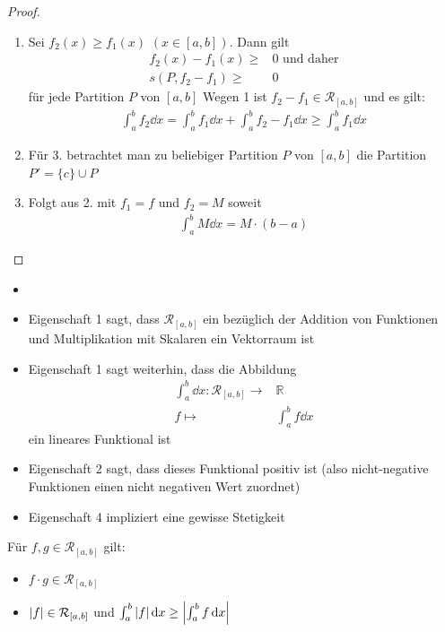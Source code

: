 \begin{proof}
\begin{enumerate}
		\item Sei $f_2(x) \geq f_1(x)$ $(x \in [a,b])$. Dann gilt
		\begin{align*}		
			f_2(x) - f_1(x) \geq & 0 \text{ und daher} \\
			s(P, f_2 -f_1) \geq & 0
		\end{align*} 
		 für jede Partition $P$ von $[a,b]$ 
		Wegen 1 ist $f_2 -f_1 \in \mathcal{R}_{[a,b]}$ und es gilt:
		\begin{align*}
			\int_a^b f_2 \dd{x} = \int_a^b f_1 \dd{x} + \int_a^bf_2-f_1 \dd{x} 
			\geq \int_a^b f_1 \dd{x}
	\end{align*}		 
	\item Für 3. betrachtet man zu beliebiger Partition $P$ von $[a,b]$ die Partition \linebreak
	$P' = \{c\} \cup P$
	\item Folgt aus 2. mit $f_1 = f$ und $f_2 = M$ soweit 
	\begin{align*}
		\int_a^b M \dd{x} = M \cdot (b-a)
	\end{align*}		
	\end{enumerate}
\end{proof}

\begin{Bemerkung}{
	\begin{itemize}
	 	\item[ ]
		\item Eigenschaft 1 sagt, dass $\mathcal{R}_{[a,b]}$ ein bezüglich der Addition von 
		Funktionen und Multiplikation mit Skalaren ein Vektorraum ist
		\item Eigenschaft 1 sagt weiterhin, dass die Abbildung 
		\begin{align*}
			\int_a^b \dd{x} : \mathcal{R}_{[a,b]} \rightarrow  & \mathbb{R} \\
			f \mapsto & \int_a^b f\dd{x}
		\end{align*}
		ein lineares Funktional ist
		\item Eigenschaft 2 sagt, dass dieses Funktional positiv ist
		(also nicht-negative Funktionen einen nicht negativen Wert zuordnet)
		\item Eigenschaft 4 impliziert eine gewisse Stetigkeit
	\end{itemize}
}\end{Bemerkung}

\begin{Satz}
	\label{vl_11_satz_25}
	Für $f,g \in \mathcal{R}_{[a,b]}$ gilt:
	\begin{itemize}
		\item $f \cdot g \in \mathcal{R}_{[a,b]}$
		\item $\abs{f} \in \mathcal{R}_{[a,b]}$ und $\int_a^b \abs{f} \dd{x} 
		\geq \abs{\int_a^b f \dd{x}}$
	\end{itemize}
\end{Satz}

